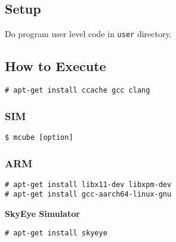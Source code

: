 \subsection{Setup}

Do program user level code in \verb|user| directory.


\subsection{How to Execute}

\noindent
\begin{Sbox}
\begin{minipage}[t]{0.975\linewidth}
\begin{verbatim}
# apt-get install ccache gcc clang
\end{verbatim}
\end{minipage}
\end{Sbox}
\fbox{\TheSbox}


\subsubsection{SIM}

\noindent
\begin{Sbox}
\begin{minipage}[t]{0.975\linewidth}
\begin{verbatim}
$ mcube [option]
\end{verbatim}
\end{minipage}
\end{Sbox}
\fbox{\TheSbox}


\subsubsection{ARM}


\noindent
\begin{Sbox}
\begin{minipage}[t]{0.975\linewidth}
\begin{verbatim}
# apt-get install libx11-dev libxpm-dev
# apt-get install gcc-aarch64-linux-gnu
\end{verbatim}
\end{minipage}
\end{Sbox}
\fbox{\TheSbox}


\noindent
\textbf{SkyEye Simulator}

\noindent
\begin{Sbox}
\begin{minipage}[t]{0.975\linewidth}
\begin{verbatim}
# apt-get install skyeye
\end{verbatim}
\end{minipage}
\end{Sbox}
\fbox{\TheSbox}


